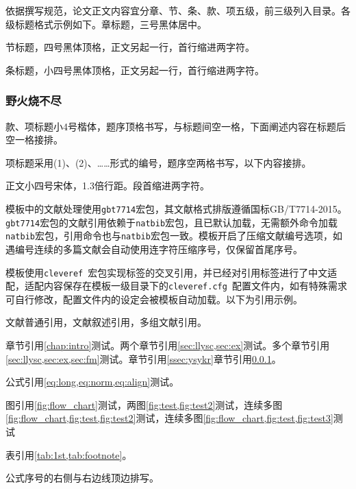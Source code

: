 \label{sec:fm}
依据撰写规范，论文正文内容宜分章、节、条、款、项五级，前三级列入目录。各级标题格式示例如下。章标题，三号黑体居中。

\label{sec:llysc}
节标题，四号黑体顶格，正文另起一行，首行缩进两字符。

\label{ssec:ysykr}
条标题，小四号黑体顶格，正文另起一行，首行缩进两字符。
\subsubsection{野火烧不尽}\label{sssec:yhsbj}
款、项标题小4号楷体，题序顶格书写，与标题间空一格，下面阐述内容在标题后空一格接排。

项标题采用(1)、(2)、……形式的编号，题序空两格书写，以下内容接排。

正文小四号宋体，1.3倍行距。段首缩进两字符。

\label{sec:ex}
模板中的文献处理使用\verb|gbt7714|宏包，其文献格式排版遵循国标GB/T7714-2015。\verb|gbt7714|宏包的文献引用依赖于\verb|natbib|宏包，且已默认加载，无需额外命令加载\verb|natbib|宏包，引用命令也与\verb|natbib|宏包一致。模板开启了压缩文献编号选项，如遇编号连续的多篇文献会自动使用连字符压缩序号，仅保留首尾序号。

模板使用\verb|cleveref|~宏包实现标签的交叉引用，并已经对引用标签进行了中文适配，适配内容保存在模板一级目录下的\verb|cleveref.cfg|~配置文件内，如有特殊需求可自行修改，配置文件内的设定会被模板自动加载。以下为引用示例。

文献普通引用\cite{同鸣2012}，文献叙述引用\citet{Boutsidis2011}，多组文献引用\cite{同鸣2012, Lee1999, Tang2013, Ding2006Orthogonal}。

章节引用\cref{chap:intro}测试。两个章节引用\cref{sec:llysc,sec:ex}测试。多个章节引用\cref{sec:llysc,sec:ex,sec:fm}测试。章节引用\cref{ssec:ysykr}章节引用\cref{sssec:yhsbj}。

公式引用\cref{eq:long,eq:norm,eq:align}测试。

图引用\cref{fig:flow_chart}测试，两图\cref{fig:test,fig:test2}测试，连续多图\cref{fig:flow_chart,fig:test,fig:test2}测试，连续多图\cref{fig:flow_chart,fig:test,fig:test3}测试

表引用\cref{tab:1st,tab:footnote}。

公式序号的右侧与右边线顶边排写。

